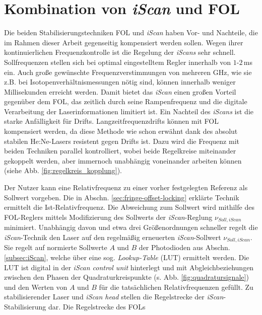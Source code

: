 \section{Kombination von \textit{iScan} und
FOL}\label{sec:iscan_und_fringe-offset-locking}
Die beiden Stabilisierungstechniken FOL und \textit{iScan} haben
Vor- und Nachteile, die im Rahmen dieser Arbeit gegenseitig kompensiert werden sollen.
Wegen ihrer kontinuierlichen Frequenzkontrolle ist die Regelung der
\textit{iScans} sehr schnell. Sollfrequenzen stellen sich bei optimal
eingestelltem Regler innerhalb von $1$-$2\,$ms ein. Auch große gewünschte
Frequenzverstimmungen von mehreren GHz, wie sie z.B. bei
Isotopenverhältnismessungen nötig sind, können innerhalb weniger Millisekunden
erreicht werden. Damit bietet das \textit{iScan} einen großen Vorteil gegenüber
dem FOL, das zeitlich durch seine Rampenfrequenz und die digitale Verarbeitung
der Laserinformationen limitiert ist.
Ein Nachteil des \textit{iScans} ist die starke Anfälligkeit für Drifts.
Langzeitfrequenzdrifts können mit FOL kompensiert werden, da
diese Methode wie schon erwähnt dank des absolut stabilen He:Ne-Lasers resistent
gegen Drifts ist. Dazu wird die Frequenz mit beiden Techniken parallel
kontrolliert, wobei beide Regelkreise miteinander gekoppelt werden, aber
immernoch unabhängig voneinander arbeiten können (siehe Abb.
\ref{fig:regelkreis_kopplung}).\par
Der Nutzer kann eine Relativfrequenz zu einer vorher festgelegten Referenz als
Sollwert vorgeben. Die in Abschn. \ref{sec:fringe-offset-locking} erklärte Technik ermittelt die Ist-Relativfrequenz. Die Abweichung zum Sollwert
wird mithilfe des FOL-Reglers mittels Modifizierung des
Sollwerts der \textit{iScan}-Reglung $\nu_{Soll,iScan}$ minimiert. Unabhängig
davon und etwa drei Größenordnungen schneller regelt die \textit{iScan}-Technik
den Laser auf den regelmäßig erneuerten \textit{iScan}-Sollwert
$\nu_{Soll,iScan}$. Sie regelt auf normierte Sollwerte $A$ und $B$ der Photodioden aus Abschn. \ref{subsec:iScan},
welche über eine sog. \textit{Lookup-Table} (LUT) ermittelt werden. Die
LUT ist digital in der \textit{iScan control unit} hinterlegt und mit
Abgleichbeziehungen zwischen den Phasen der Quadraturkreispunkte (s. Abb.
\ref{fig:quadratursignale}) und den Werten von $A$ und $B$ für die tatsächlichen
Relativfrequenzen gefüllt.
Zu stabilisierender Laser und \textit{iScan head} stellen die Regelstrecke der
\textit{iScan}-Stabilisierung dar. Die Regelstrecke des FOLs
